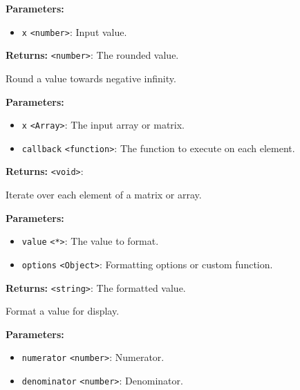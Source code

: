 \documentclass[12pt,a4paper]{article}
\begin{document}
\noindent \textbf{Parameters:}
\begin{itemize}
  \item \texttt{x} \texttt{<number>}: Input value.
\end{itemize}

\noindent \textbf{Returns:} \texttt{<number>}: The rounded value.

\noindent Round a value towards negative infinity.

\vspace{5mm}
\noindent {}


\noindent \textbf{Parameters:}
\begin{itemize}
  \item \texttt{x} \texttt{<Array>}: The input array or matrix.
  \item \texttt{callback} \texttt{<function>}: The function to execute on each element.
\end{itemize}

\noindent \textbf{Returns:} \texttt{<void>}: 

\noindent Iterate over each element of a matrix or array.

\vspace{5mm}
\noindent {}


\noindent \textbf{Parameters:}
\begin{itemize}
  \item \texttt{value} \texttt{<*>}: The value to format.
  \item \texttt{options} \texttt{<Object>}: Formatting options or custom function.
\end{itemize}

\noindent \textbf{Returns:} \texttt{<string>}: The formatted value.

\noindent Format a value for display.

\vspace{5mm}
\noindent {}


\noindent \textbf{Parameters:}
\begin{itemize}
  \item \texttt{numerator} \texttt{<number>}: Numerator.
  \item \texttt{denominator} \texttt{<number>}: Denominator.
\end{itemize}
\end{document}
